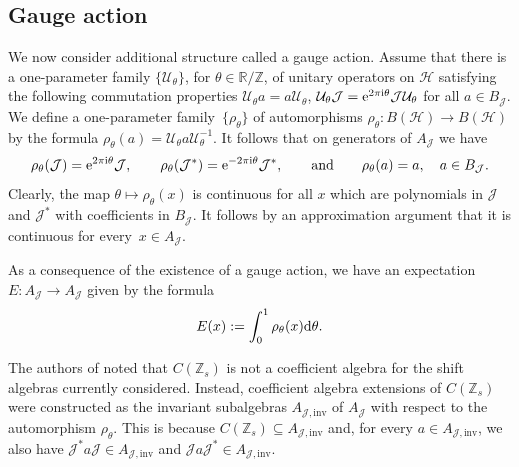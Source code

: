 \documentclass[pdftex]{sigma}
\newcommand{\R}{{\mathbb R}}
\newcommand{\Z}{{\mathbb Z}}
\newcommand{\jcal}{{\mathcal J}}
\numberwithin{equation}{section}
\begin{document}
\subsection{Gauge action}
We now consider additional structure called a gauge action. Assume that there is a one-parameter family $\{\mathcal{U}_\theta\}$, for $\theta\in\R/\Z$, of unitary operators on $\mathcal{H}$ satisfying the following commutation properties
$\mathcal{U}_\theta a = a \mathcal{U}_\theta $, $ \mathcal{U}_\theta \mathcal{J} = {\rm e}^{2\pi {\rm i}\theta}\mathcal{J} \mathcal{U}_\theta
$
for all $a\in B_\jcal$.
We define a one-parameter family~$\{\rho_\theta\}$ of automorphisms $\rho_\theta\colon B(\mathcal{H})\to B(\mathcal{H})$ by the formula
$
\rho_\theta(a)=\mathcal{U}_\theta a \mathcal{U}_\theta^{-1}$.
It follows that on generators of $A_{\mathcal{J}}$ we have
\[
\rho_\theta(\mathcal{J})={\rm e}^{2\pi {\rm i}\theta}\mathcal{J}, \qquad\rho_\theta(\mathcal{J}^*)={\rm e}^{-2\pi {\rm i}\theta}\mathcal{J}^*,\qquad \text{and} \qquad\rho_\theta(a) = a,\quad a\in B_\jcal.
\]
Clearly, the map $\theta\mapsto \rho_\theta(x)$ is continuous for all $x$ which are polynomials in $\mathcal{J}$ and $\mathcal{J}^*$ with coefficients in $B_\jcal$. It follows by an approximation argument that it is continuous for every~${x\in A_{\mathcal{J}}}$.

As a consequence of the existence of a gauge action, we have an expectation
$E\colon A_\mathcal{J}\to A_\mathcal{J}$
given by the formula
\begin{equation}\label{expect_formula}
E(x):=\int_0^1 \rho_\theta(x) {\rm d}\theta.
\end{equation}

The authors of \cite{HKMP3} noted that $C(\Z_s)$ is not a coefficient algebra for the shift algebras currently considered. Instead, coefficient algebra extensions of $C(\Z_s)$ were constructed as the invariant subalgebras $A_{\mathcal{J},\textrm{inv}}$ of $A_\mathcal{J}$ with respect to the automorphism $\rho_\theta$.
This is because $C(\Z_s)\subseteq A_{\mathcal{J},\textrm{inv}}$ and, for every $a\in A_{\mathcal{J},\textrm{inv}}$, we also have
$
\mathcal{J}^*a\mathcal{J}\in A_{\mathcal{J},\textrm{inv}}$ and $ \mathcal{J}a\mathcal{J}^*\in A_{\mathcal{J},\textrm{inv}}$.
\end{document}

